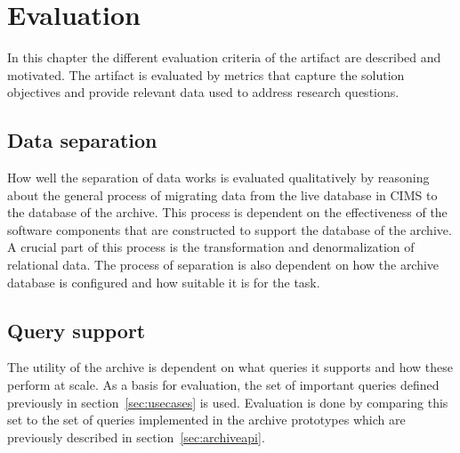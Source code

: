 \chapter{Evaluation}
\label{chap:eval}

In this chapter the different evaluation criteria of the artifact are described and motivated. The artifact is evaluated by metrics that capture the solution objectives and provide relevant data used to address research questions.

\section{Data separation}
How well the separation of data works is evaluated qualitatively by reasoning about the general process of migrating data from the live database in CIMS to the database of the archive. This process is dependent on the effectiveness of the software components that are constructed to support the database of the archive.
A crucial part of this process is the transformation and denormalization of relational data. The process of separation is also dependent on how the archive database is configured and how suitable it is for the task. 

\section{Query support}
The utility of the archive is dependent on what queries it supports and how these perform at scale. As a basis for evaluation, the set of important queries defined previously in section~\ref{sec:usecases} is used. Evaluation is done by comparing this set to the set of queries implemented in the archive prototypes which are previously described in section~\ref{sec:archiveapi}.


%

